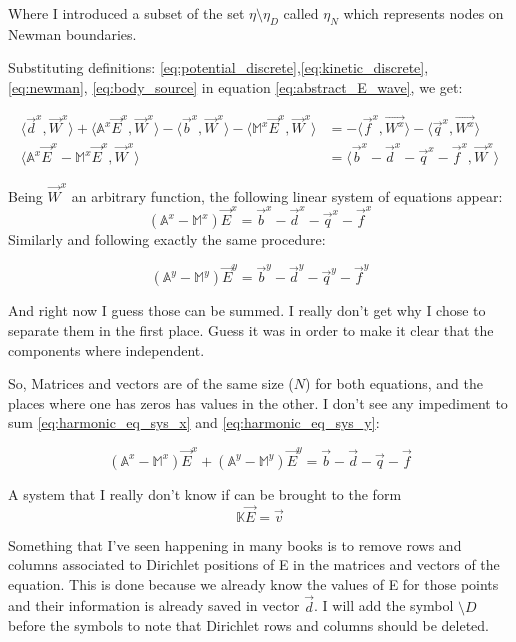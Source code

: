 Where I introduced a subset of the set $\eta  \setminus \eta_D$ called $\eta_N$ which represents nodes on Newman boundaries.

Substituting definitions: \ref{eq:potential_discrete},\ref{eq:kinetic_discrete}, \ref{eq:newman},  \ref{eq:body_source} in equation \ref{eq:abstract_E_wave}, we get:

\begin{align}
\langle\vec{d}^x,\vec{W}^x\rangle
+\langle\mathbb{A}^x\vec{E}^x,\vec{W}^x\rangle-\langle \vec{b}^x,\vec{W}^x\rangle
-\langle\mathbb{M}^x\vec{E}^x,\vec{W}^x\rangle &= -\langle \vec{f}^x, \vec{W^x}\rangle-\langle \vec{q}^x, \vec{W^x}\rangle \nonumber\\
\langle\mathbb{A}^x\vec{E}^x- \mathbb{M}^x\vec{E}^x,\vec{W}^x \rangle &=\langle \vec{b}^x-\vec{d}^x-\vec{q}^x-\vec{f}^x , \vec{W}^x \rangle
\end{align}

Being $\vec{W}^x$ an arbitrary function, the following linear system of equations appear:
\begin{equation}
\left(\mathbb{A}^x-\mathbb{M}^x\right)\vec{E}^x = \vec{b}^x-\vec{d}^x-\vec{q}^x-\vec{f}^x \label{eq:harmonic_eq_sys_x}
\end{equation}
Similarly and following exactly the same procedure:

\begin{equation}
\left(\mathbb{A}^y-\mathbb{M}^y\right)\vec{E}^y = \vec{b}^y-\vec{d}^y-\vec{q}^y-\vec{f}^y \label{eq:harmonic_eq_sys_y}
\end{equation}

And right now I guess those can be summed. I really don't get why I chose to separate them in the first place. Guess it was in order to make it clear that the components where independent.

So, Matrices and vectors are of the same size ($N$) for both equations, and the places where one has zeros has values in the other. I don't see any impediment to sum  \ref{eq:harmonic_eq_sys_x} and \ref{eq:harmonic_eq_sys_y}:

\begin{equation*}
\left(\mathbb{A}^x-\mathbb{M}^x\right)\vec{E}^x+
\left(\mathbb{A}^y-\mathbb{M}^y\right)\vec{E}^y= \vec{b}-\vec{d}-\vec{q}-\vec{f}
\end{equation*}

A system that I really don't know if can be brought to the form $$\mathbb{K}\vec{E}=\vec{v}$$

Something that I've seen happening in many books is to remove rows and columns associated to Dirichlet positions of E in the matrices and vectors of the equation. This is done because we already know the values of E for those points and their information is already saved in vector $\vec{d}$. I will add the symbol $\setminus D$ before the symbols to note that Dirichlet rows and columns should be deleted.


